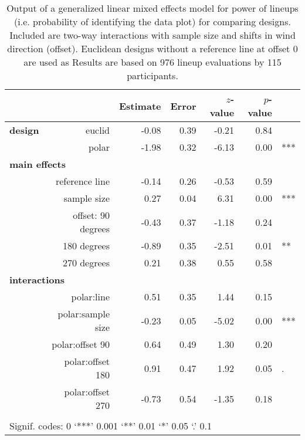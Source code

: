 \begin{table}[ht]
\begin{center}
\resizebox{\linewidth}{!} {
\begin{tabular}{rrrrrrl}
  \hline
& & Estimate & Error & $z$-value & $p$-value &\\ 
  \hline
\bf design & euclid & -0.08 & 0.39 & -0.21 & 0.84 &\\ 
&polar & -1.98 & 0.32 & -6.13 & 0.00 & ***\\ [3pt]
\multicolumn{2}{l}{\bf main effects} &&&&&\\
& reference line  & -0.14 & 0.26 & -0.53 & 0.59 & \\ [1pt]
&  sample size & 0.27 & 0.04 & 6.31 & 0.00 & ***\\[1pt]
 &offset:  90 degrees& -0.43 & 0.37 & -1.18 & 0.24 &\\ 
  & 180 degrees& -0.89 & 0.35 & -2.51 & 0.01 & **\\ 
  & 270 degrees& 0.21 & 0.38 & 0.55 & 0.58 &\\ [3pt]
\multicolumn{2}{l}{\bf interactions} &&&&&\\
&  polar:line & 0.51 & 0.35 & 1.44 & 0.15 &\\ [1pt]
&    polar:sample size & -0.23 & 0.05 & -5.02 & 0.00 & ***\\[1pt]
&    polar:offset 90 & 0.64 & 0.49 & 1.30 & 0.20 \\ 
&  polar:offset 180 & 0.91 & 0.47 & 1.92 & 0.05 & .\\ 
&    polar:offset 270 & -0.73 & 0.54 & -1.35 & 0.18 &\\
   \hline
\\[-5pt]
   \multicolumn{5}{l}{Signif. codes:  0 `***' 0.001 `**' 0.01 `*' 0.05 `.' 0.1}
\end{tabular}
}
\end{center}
\caption{\label{tbl:correct} Output of a generalized linear mixed effects model for power of lineups (i.e. probability of identifying the data plot) for comparing designs. Included are two-way interactions with sample size and shifts in wind direction (offset). Euclidean designs without a reference line at offset 0 are used as 
 Results are based on  976 lineup evaluations by 115 participants. }
\end{table}



